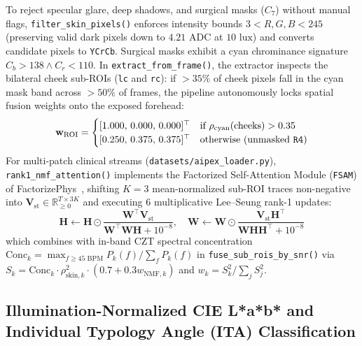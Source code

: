 \documentclass[conference]{IEEEtran}
\begin{document}
To reject specular glare, deep shadows, and surgical masks ($C_7$) without manual flags, \texttt{filter\_skin\_pixels()} enforces intensity bounds $3 < R, G, B < 245$ (preserving valid dark pixels down to $4.21\text{ ADC}$ at $10\text{ lux}$) and converts candidate pixels to \texttt{YCrCb}. Surgical masks exhibit a cyan chrominance signature $C_b > 138 \land C_r < 110$. In \texttt{extract\_from\_frame()}, the extractor inspects the bilateral cheek sub-ROIs (\texttt{lc} and \texttt{rc}): if $>35\%$ of cheek pixels fall in the cyan mask band across $>50\%$ of frames, the pipeline autonomously locks spatial fusion weights onto the exposed forehead:
\begin{equation}
\mathbf{w}_{\text{ROI}} = \begin{cases}
[1.000, \, 0.000, \, 0.000]^\top & \text{if } \rho_{\text{cyan}}(\text{cheeks}) > 0.35 \\ \relax
[0.250, \, 0.375, \, 0.375]^\top & \text{otherwise (unmasked \texttt{R4})}
\end{cases}
\label{eq:mask_gate}
\end{equation}
For multi-patch clinical streams (\texttt{datasets/aipex\_loader.py}), \texttt{rank1\_nmf\_attention()} implements the Factorized Self-Attention Module (\texttt{FSAM}) of FactorizePhys~\cite{joshi2024factorizephys}, shifting $K=3$ mean-normalized sub-ROI traces non-negative into $\mathbf{V}_{\text{st}} \in \mathbb{R}_{\ge 0}^{T \times 3K}$ and executing 6 multiplicative Lee--Seung rank-1 updates:
\begin{equation}
\mathbf{H} \leftarrow \mathbf{H} \odot \frac{\mathbf{W}^\top \mathbf{V}_{\text{st}}}{\mathbf{W}^\top \mathbf{W} \mathbf{H} + 10^{-8}}, \quad \mathbf{W} \leftarrow \mathbf{W} \odot \frac{\mathbf{V}_{\text{st}} \mathbf{H}^\top}{\mathbf{W} \mathbf{H} \mathbf{H}^\top + 10^{-8}}
\label{eq:nmf}
\end{equation}
which combines with in-band CZT spectral concentration $\text{Conc}_k = \max_{f \ge 45\text{ BPM}} P_k(f) / \sum_f P_k(f)$ in \texttt{fuse\_sub\_rois\_by\_snr()} via $S_k = \text{Conc}_k \cdot \rho_{\text{skin},k}^2 \cdot (0.7 + 0.3 w_{\text{NMF},k})$ and $w_k = S_k^2 / \sum_j S_j^2$.

\subsection{Illumination-Normalized CIE L*a*b* and Individual Typology Angle (ITA) Classification}
\end{document}
